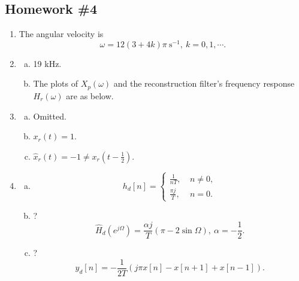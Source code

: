 \documentclass{article}
\begin{document}
    \subsection*{Homework \#4}
        \begin{enumerate}
            \item The angular velocity is \[
                \omega = 12(3 + 4k) \pi\ \text{s}^{-1},\ k = 0, 1, \cdots.
            \]
            
            \item 
            \begin{enumerate}[(a)]
                \item 19 kHz.
                \item The plots of $X_p(\omega)$ and the reconstruction filter's frequency response $H_r(\omega)$ are as below.
                \vspace{-1em}
                \begin{figure}[htbp]
                    \tiny
                    \centering
                    \hspace*{6em}
                    
                    \vspace{-4em}
                    \hspace*{6em}
                    
                \end{figure}
            \end{enumerate}	

            \item 
            \begin{enumerate}[(a)]
                \item Omitted.
                \item $x_r(t) = 1$.
                \item $\hat{x}_r(t) = -1 \neq x_r(t - \frac{1}{2})$.
            \end{enumerate}	
            
            \item 
            \begin{enumerate}[(a)]
                \item \[
                    h_d[n] = \begin{cases}
                        \frac{1}{nT} ,\ & n \neq 0, \\
                        \frac{\pi j}{T},\ & n = 0.
                    \end{cases}
                \]
                \item ? \[
                    \hat{H}_d(e^{j \Omega}) = \frac{\alpha j}{T} (\pi - 2\sin \Omega),\ \alpha = -\frac{1}{2}.
                \]
                \item ? \[
                    y_d[n] = -\frac{1}{2T}(j\pi x[n] - x[n + 1] + x[n - 1]).
                \]
            \end{enumerate}	
            

\end{enumerate}
\end{document}
